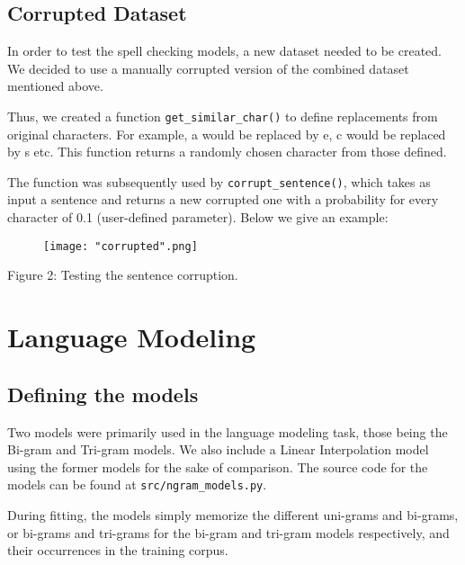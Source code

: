 \documentclass[11pt, a4paper]{article}
\begin{document}
	\subsection{Corrupted Dataset}
	
	In order to test the spell checking models, a new dataset needed to be created. We decided to use a manually corrupted version of the combined dataset mentioned above.
	
	Thus, we created a function \texttt{get\_similar\_char()} to define replacements from original characters. For example, a would be replaced by e, c would be replaced by s etc. This function returns a randomly chosen character from those defined.
	
	The function was subsequently used by \texttt{corrupt\_sentence()}, which takes as input a sentence and returns a new corrupted one with a probability for every character of 0.1 (user-defined parameter). Below we give an example:
 
  \begin{figure}[H]
    \centering
    \texttt{[image: "corrupted".png]}
    
    \label{fig:galaxy}
\end{figure}

 \begin{centering}



\renewcommand{\caption}{Figure 2: }
\caption{Testing the sentence corruption.}

\end{centering}
	
	\section{Language Modeling}
	
	\subsection{Defining the models}
	
	Two models were primarily used in the language modeling task, those being the Bi-gram and Tri-gram models. We also include a Linear Interpolation model using the former models for the sake of comparison. The source code for the models can be found at \texttt{src/ngram\_models.py}.
	
	During fitting, the models simply memorize the different uni-grams and bi-grams, or bi-grams and tri-grams for the bi-gram and tri-gram models respectively, and their occurrences in the training corpus. 
	
\end{document}
